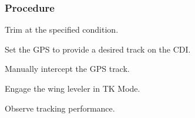 % 
% 
%
 \subsubsection*{Procedure}
 \begin{compactenum}
    \item Trim at the specified condition.
    \item Set the GPS to provide a desired track on the CDI.
    \item Manually intercept the GPS track.
    \item Engage the wing leveler in TK Mode.
    \item Observe tracking performance.
    \end{compactenum}
